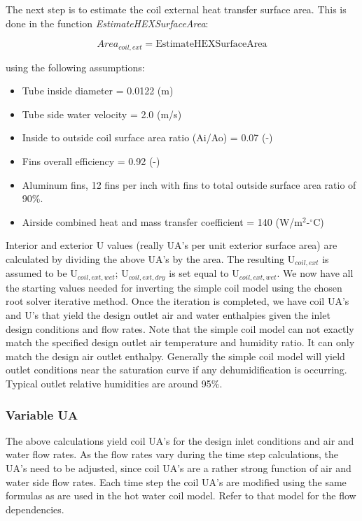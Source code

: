 The next step is to estimate the coil external heat transfer surface area. This is done in the function \emph{EstimateHEXSurfaceArea}:

\begin{equation}
Are{a_{coil,ext}} = {\mathrm{EstimateHEXSurfaceArea}}
\end{equation}

using the following assumptions:

\begin{itemize}
\item
  Tube inside diameter = 0.0122 (m)
\item
  Tube side water velocity = 2.0 (m/s)
\item
  Inside to outside coil surface area ratio (Ai/Ao) = 0.07 (-)
\item
  Fins overall efficiency = 0.92 (-)
\item
  Aluminum fins, 12 fins per inch with fins to total outside surface area ratio of 90\%.
\item
  Airside combined heat and mass transfer coefficient = 140 (W/m\(^2\)-\(^{\circ}\)C)
\end{itemize}

Interior and exterior U values (really UA's per unit exterior surface area) are calculated by dividing the above UA's by the area. The resulting U\(_{coil,ext}\) is assumed to be U\(_{coil,ext,wet}\); U\(_{coil,ext,dry}\) is set equal to U\(_{coil,ext,wet}\). We now have all the starting values needed for inverting the simple coil model using the chosen root solver iterative method. Once the iteration is completed, we have coil UA's and U's that yield the design outlet air and water enthalpies given the inlet design conditions and flow rates. Note that the simple coil model can not exactly match the specified design outlet air temperature and humidity ratio. It can only match the design air outlet enthalpy. Generally the simple coil model will yield outlet conditions near the saturation curve if any dehumidification is occurring. Typical outlet relative humidities are around 95\%.

\subsubsection{Variable UA}\label{variable-ua}

The above calculations yield coil UA's for the design inlet conditions and air and water flow rates. As the flow rates vary during the time step calculations, the UA's need to be adjusted, since coil UA's are a rather strong function of air and water side flow rates. Each time step the coil UA's are modified using the same formulas as are used in the hot water coil model. Refer to that model for the flow dependencies.

